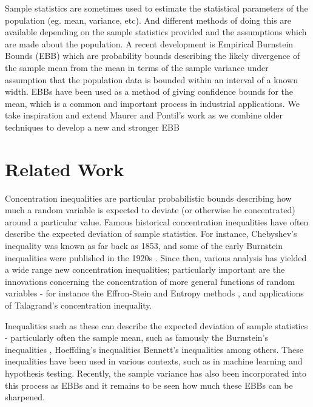 \documentclass[aap,preprint]{imsart}
\begin{document}
Sample statistics are sometimes used to estimate the statistical parameters of the population (eg. mean, variance, etc).
And different methods of doing this are available depending on the sample statistics provided and the assumptions which are made about the population.
A recent development is Empirical Burnstein Bounds (EBB)\cite{Maurer50empiricalbernstein,10.1007/978-3-540-75225-7_15} which are probability bounds describing the likely divergence of the sample mean from the mean in terms of the sample variance under assumption that the population data is bounded within an interval of a known width.
EBBs have been used as a method of giving confidence bounds for the mean, which is a common and important process in industrial applications.
We take inspiration and extend Maurer and Pontil's work \cite{Maurer50empiricalbernstein} as we combine older techniques to develop a new and stronger EBB

\section{Related Work}
Concentration inequalities are particular probabilistic bounds describing how much a random variable is expected to deviate (or otherwise be concentrated) around a particular value.
Famous historical concentration inequalities have often describe the expected deviation of sample statistics.
For instance, Chebyshev's inequality was known as far back as 1853\cite{Chebyshev1}, and some of the early Burnstein inequalities were published in the 1920s \cite{burnstein1}.
Since then, various analysis has yielded a wide range new concentration inequalities\cite{MR3363542,Boucheron2004}; particularly important are the innovations concerning the concentration of more general functions of random variables - for instance the Effron-Stein\cite{efron1981} and Entropy methods \cite{Boucheron_concentrationinequalities}, and applications of Talagrand's concentration inequality\cite{Talagrand1995}.

Inequalities such as these can describe the expected deviation of sample statistics - particularly often the sample mean, such as famously the Burnstein's inequalities \cite{burnstein1}, Hoeffding's inequalities \cite{hoeffding1} Bennett's inequalities \cite{10.2307/2282438} among others.
These inequalities have been used in various contexts, such as in machine learning and hypothesis testing.\cite{Maron1997,Mnih:2008:EBS:1390156.1390241,8000571,Zia-UrRehman2012,DBLP:conf/aaai/ThomasTG15,Maurer50empiricalbernstein}
Recently, the sample variance has also been incorporated into this process as EBBs \cite{Maurer50empiricalbernstein,10.1007/978-3-540-75225-7_15} and it remains to be seen how much these EBBs can be sharpened.
\end{document}
